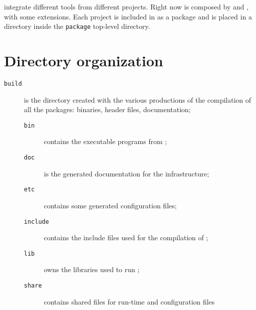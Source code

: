 \documentclass[a4paper]{article}
\begin{document}
\Apfa integrate different tools from different projects. Right now \Apfa
is composed by \Apips and \Apolylib, with some extensions. Each project is
included in \Apfa as a package and is placed in a directory inside the
\texttt{package} top-level directory.


\section{Directory organization}
\label{sec:direct-organ}

\begin{description}
\item[\texttt{build}] is the directory created with the various productions
  of the compilation of all the \Apfa packages: binaries, header files,
  documentation;
  \begin{description}
  \item[\texttt{bin}] contains the executable programs from \Apfa;
  \item[\texttt{doc}] is the generated documentation for the \Apfa
    infrastructure;
  \item[\texttt{etc}] contains some generated configuration files;
  \item[\texttt{include}] contains the include files used for the
    compilation of \Apfa;
  \item[\texttt{lib}] owns the libraries used to run \Apfa;
  \item[\texttt{share}] contains shared files for run-time and
    configuration files



\end{description}
\end{description}
\end{document}
